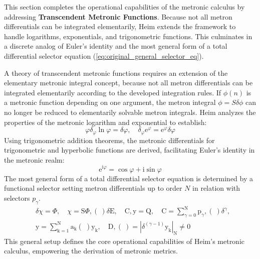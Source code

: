 \documentclass[12pt]{article}
\begin{document}
This section completes the operational capabilities of the metronic calculus by addressing \textbf{Transcendent Metronic Functions}. Because not all metron differentials can be integrated elementarily, Heim extends the framework to handle logarithms, exponentials, and trigonometric functions. This culminates in a discrete analog of Euler's identity and the most general form of a total differential selector equation (\eqref{eq:original_general_selector_eq}).

A theory of transcendent metronic functions requires an extension of the elementary metronic integral concept, because not all metron differentials can be integrated elementarily according to the developed integration rules. If \( \phi(n) \) is a metronic function depending on one argument, the metron integral \( \phi = S \delta \phi \) can no longer be reduced to elementarily solvable metron integrals. Heim analyzes the properties of the metronic logarithm and exponential to establish:
\begin{equation}
\varphi \delta_\varphi \ln \varphi = \delta\varphi, \quad \delta_\varphi \mathrm{e}^\varphi = \mathrm{e}^\varphi \delta\varphi \tag{81}
\end{equation}
Using trigonometric addition theorems, the metronic differentials for trigonometric and hyperbolic functions are derived, facilitating Euler's identity in the metronic realm:
\begin{equation}
\mathrm{e}^{\mathrm{i}\varphi} = \cos \varphi + \mathrm{i} \sin \varphi \tag{81a}
\end{equation}
The most general form of a total differential selector equation is determined by a functional selector setting metron differentials up to order \( N \) in relation with selectors \( p_\gamma \).
\begin{equation}
\begin{aligned}
& \delta\chi = \Phi, \quad \chi = \mathrm{S}\Phi, (\ ) \delta\mathrm{E}, \quad \mathrm{C}, \mathrm{y} = \mathrm{Q}, \quad \mathrm{C} = \sum_{\gamma=0}^\mathrm{N} \mathrm{p}_\gamma, (\ ) \delta^\gamma, \\
& \mathrm{y} = \sum_{\mathrm{k}=1}^\mathrm{N} \mathrm{a_k} \binom{\ }{ } \mathrm{y_k}, \quad \mathrm{D}, (\ ) = \left| \delta^{(\gamma-1)} \mathrm{y_k} \right|_\mathrm{N} \neq 0
\end{aligned} \tag{82}
\label{eq:original_general_selector_eq}
\end{equation}
This general setup defines the core operational capabilities of Heim's metronic calculus, empowering the derivation of metronic metrics.
\end{document}

